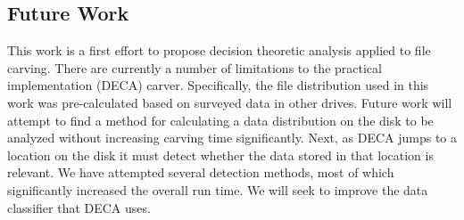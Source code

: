 \documentclass[final,5p,times,twocolumn,authoryear]{elsarticle}
\begin{document}
\subsection{Future Work}
This work is a first effort to propose decision theoretic analysis applied to file carving. There are currently a number of limitations to the practical implementation (DECA) carver. Specifically, the file distribution used in this work was pre-calculated based on surveyed data in other drives. Future work will attempt to find a method for calculating a data distribution on the disk to be analyzed without increasing carving time significantly. Next, as DECA jumps to a location on the disk it must detect whether the data stored in that location is relevant. We have attempted several detection methods, most of which significantly increased the overall run time. We will seek to improve the data classifier that DECA uses. 



 

\end{document}
